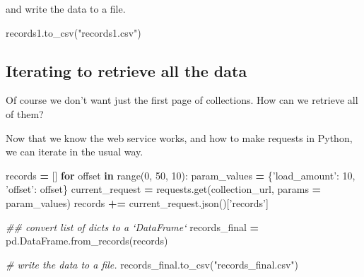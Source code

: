 \documentclass[
]{book}
\newenvironment{Shaded}{\begin{snugshade}}{\end{snugshade}}
\newcommand{\BuiltInTok}[1]{#1}
\newcommand{\CommentTok}[1]{\textcolor[rgb]{0.56,0.35,0.01}{\textit{#1}}}
\newcommand{\ControlFlowTok}[1]{\textcolor[rgb]{0.13,0.29,0.53}{\textbf{#1}}}
\newcommand{\DecValTok}[1]{\textcolor[rgb]{0.00,0.00,0.81}{#1}}
\newcommand{\KeywordTok}[1]{\textcolor[rgb]{0.13,0.29,0.53}{\textbf{#1}}}
\newcommand{\NormalTok}[1]{#1}
\newcommand{\OperatorTok}[1]{\textcolor[rgb]{0.81,0.36,0.00}{\textbf{#1}}}
\newcommand{\StringTok}[1]{\textcolor[rgb]{0.31,0.60,0.02}{#1}}
\begin{document}
and write the data to a file.

\begin{Shaded}
\begin{Highlighting}[]
\NormalTok{records1.to_csv(}\StringTok{"records1.csv"}\NormalTok{)}
\end{Highlighting}
\end{Shaded}

\hypertarget{iterating-to-retrieve-all-the-data}{%
\subsection{Iterating to retrieve all the data}\label{iterating-to-retrieve-all-the-data}}

Of course we don't want just the first page of collections. How can we
retrieve all of them?

Now that we know the web service works, and how to make requests in
Python, we can iterate in the usual way.

\begin{Shaded}
\begin{Highlighting}[]
\NormalTok{records }\OperatorTok{=}\NormalTok{ []}
\ControlFlowTok{for}\NormalTok{ offset }\KeywordTok{in} \BuiltInTok{range}\NormalTok{(}\DecValTok{0}\NormalTok{, }\DecValTok{50}\NormalTok{, }\DecValTok{10}\NormalTok{):}
\NormalTok{    param_values }\OperatorTok{=}\NormalTok{ \{}\StringTok{'load_amount'}\NormalTok{: }\DecValTok{10}\NormalTok{, }\StringTok{'offset'}\NormalTok{: offset\}}
\NormalTok{    current_request }\OperatorTok{=}\NormalTok{ requests.get(collection_url, params }\OperatorTok{=}\NormalTok{ param_values)}
\NormalTok{    records }\OperatorTok{+=}\NormalTok{ current_request.json()[}\StringTok{'records'}\NormalTok{]}
\end{Highlighting}
\end{Shaded}

\begin{Shaded}
\begin{Highlighting}[]
\CommentTok{## convert list of dicts to a `DataFrame`}
\NormalTok{records_final }\OperatorTok{=}\NormalTok{ pd.DataFrame.from_records(records)}
\end{Highlighting}
\end{Shaded}

\begin{Shaded}
\begin{Highlighting}[]
\CommentTok{# write the data to a file.}
\NormalTok{records_final.to_csv(}\StringTok{"records_final.csv"}\NormalTok{)}
\end{Highlighting}
\end{Shaded}
\end{document}
